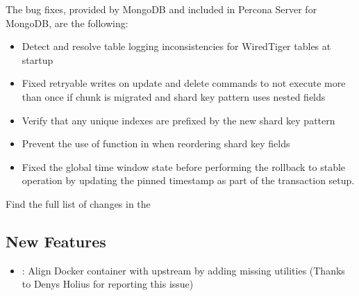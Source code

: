 \documentclass[letterpaper,10pt,english]{sphinxmanual}
\begin{document}
\sphinxAtStartPar
The bug fixes, provided by MongoDB and included in Percona Server for MongoDB, are the following:
\begin{itemize}
\item {} 
\sphinxAtStartPar
{} \sphinxhyphen{} Detect and resolve table logging inconsistencies for WiredTiger tables at startup

\item {} 
\sphinxAtStartPar
{} \sphinxhyphen{} Fixed retryable writes on update and delete commands to not execute more than once if chunk is migrated and shard key pattern uses nested fields

\item {} 
\sphinxAtStartPar
{} \sphinxhyphen{} Verify that any unique indexes are prefixed by the new shard key pattern

\item {} 
\sphinxAtStartPar
{} \sphinxhyphen{} Prevent the use of  function in  when reordering shard key fields

\item {} 
\sphinxAtStartPar
{} \sphinxhyphen{} Fixed the global time window state before performing the rollback to stable operation by updating the pinned timestamp as part of the transaction setup.

\end{itemize}

\sphinxAtStartPar
Find the full list of changes in the 


\subsection{New Features}
\label{\detokenize{release_notes/4.4.17-17:new-features}}\begin{itemize}
\item {} 
\sphinxAtStartPar
{}: Align Docker container with upstream by adding missing  utilities (Thanks to Denys Holius for reporting this issue)

\end{itemize}
\end{document}
